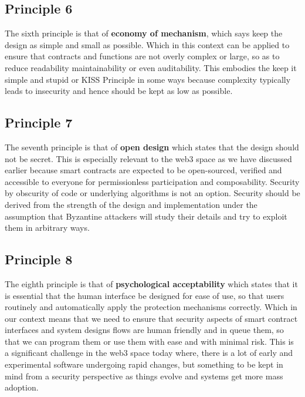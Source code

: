 \subsection{Principle 6}\label{principle-6}

The sixth principle is that of \textbf{economy of mechanism}, which says
keep the design as simple and small as possible. Which in this context
can be applied to ensure that contracts and functions are not overly
complex or large, so as to reduce readability maintainability or even
auditability. This embodies the keep it simple and stupid or KISS
Principle in some ways because complexity typically leads to insecurity
and hence should be kept as low as possible.

\subsection{Principle 7}\label{principle-7}

The seventh principle is that of \textbf{open design} which states that
the design should not be secret. This is especially relevant to the web3
space as we have discussed earlier because smart contracts are expected
to be open-sourced, verified and accessible to everyone for
permissionless participation and composability. Security by obscurity of
code or underlying algorithms is not an option. Security should be
derived from the strength of the design and implementation under the
assumption that Byzantine attackers will study their details and try to
exploit them in arbitrary ways.

\subsection{Principle 8}\label{principle-8}

The eighth principle is that of \textbf{psychological acceptability}
which states that it is essential that the human interface be designed
for ease of use, so that users routinely and automatically apply the
protection mechanisms correctly. Which in our context means that we need
to ensure that security aspects of smart contract interfaces and system
designs flows are human friendly and in queue them, so that we can
program them or use them with ease and with minimal risk. This is a
significant challenge in the web3 space today where, there is a lot of
early and experimental software undergoing rapid changes, but something
to be kept in mind from a security perspective as things evolve and
systems get more mass adoption.

